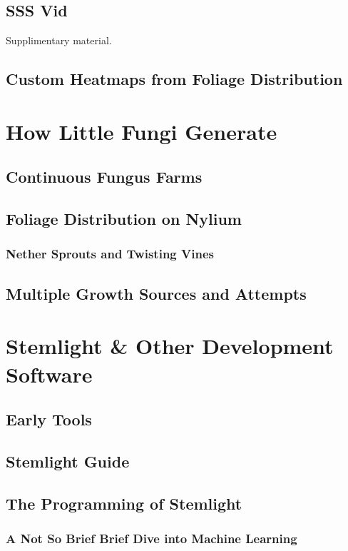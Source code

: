 \documentclass[11pt,a4paper]{article}
\begin{document}
    \subsection{SSS Vid}
Supplimentary material.
    \lipsum[12]
    \subsection{Custom Heatmaps from Foliage Distribution}
    \lipsum[16]

\section{How Little Fungi Generate}
    \subsection{Continuous Fungus Farms}
    \lipsum[14]
    \subsection{Foliage Distribution on Nylium}
    \lipsum[17]
    \subsubsection{Nether Sprouts and Twisting Vines}
    \lipsum[13]
    \subsection{Multiple Growth Sources and Attempts}
    \lipsum[14]


\section{Stemlight \& Other Development Software}
    \subsection{Early Tools}
    \lipsum[13]
    \subsection{Stemlight Guide}
    \lipsum[14]
    \subsection{The Programming of Stemlight}
    \lipsum[14]
    \subsubsection{A Not So Brief Brief Dive into Machine Learning}
    \lipsum[11]
\end{document}
